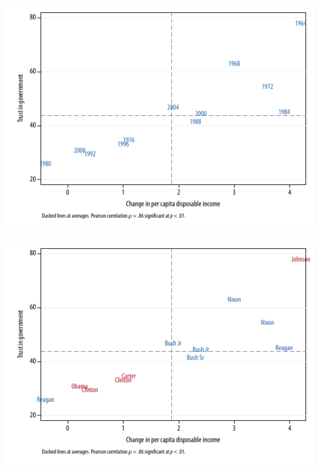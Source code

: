 \documentclass[t]{beamer}
\begin{document}
	\begin{frame}[c] %
			
		\begin{center}
			\includegraphics[width=\textwidth]{trust-correlation-1}
		\end{center}
				
	\end{frame}

	\begin{frame}[c] %
			
		\begin{center}
			\includegraphics[width=\textwidth]{trust-correlation-2}
		\end{center}
				
	\end{frame}
		
\end{document}

